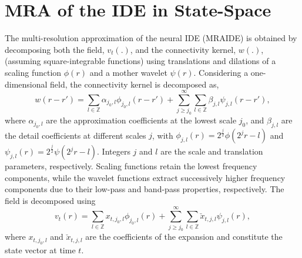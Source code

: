 \documentclass[journal]{IEEEtran}
\newcommand{\dean}[1]{\textcolor{green}{#1}}
\begin{document}
\section{MRA of the IDE in State-Space}
The multi-resolution approximation of the neural IDE (MRAIDE) is obtained by decomposing both the field, $v_t(.)$, and the connectivity kernel, $w(.)$, (assuming square-integrable functions) using translations and dilations of a scaling function $\phi(r)$ and a mother wavelet $\psi(r)$. Considering a one-dimensional field, the connectivity kernel is decomposed as,
\begin{equation}
 w\left(r-r'\right)=\sum_{l \in \mathbb{Z}}\alpha_{j_0,l}\phi_{j_0,l}\left(r-r'\right)+\sum_{j\geq j_0}^{\infty} \sum_{l \in \mathbb{Z}}\beta_{j,l}\psi_{j,l}\left(r-r'\right), 
\label{eq:KernelExpansion}
\end{equation}
where $\alpha_{j_0,l}$ are the approximation coefficients at the lowest scale $j_0$, and $\beta_{j,l}$ are the detail coefficients at different scales $j$, with $\phi_{j,l}\left(r\right)=2^{\frac{j}{2}}\phi\left(2^jr-l\right) $ and $\psi_{j,l}\left(r\right)=2^{\frac{j}{2}}\psi\left(2^jr-l\right)$. Integers $j$ and $l$ are the scale and translation parameters, respectively. Scaling functions retain the lowest frequency components, while the wavelet functions extract successively higher frequency components due to their low-pass and band-pass properties, respectively. The field is decomposed using
\begin{equation}
 v_t\left(r\right)=\sum_{l \in \mathbb{Z}}x_{t,j_{0},l}\phi_{j_{0},l}\left(r\right)+\sum_{j\geq j_0}^{\infty} \sum_{l \in \mathbb{Z}} \check{x}_{t,j,l}\psi_{j,l}\left(r\right),
\label{eq:FieldExpansion}
\end{equation}
where $x_{t,j_{0},l}$ and $\check{x}_{t,j,l} $ are the coefficients of the expansion and constitute the state vector at time $t$. %
\end{document}
